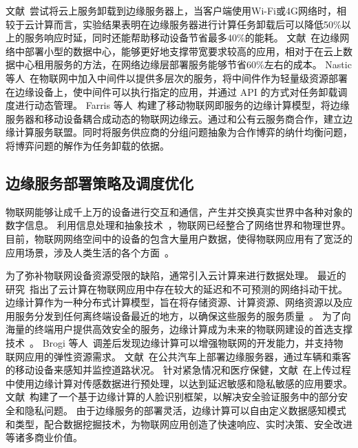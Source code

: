文献~\cite{gao2015cloudlets}尝试将云上服务卸载到边缘服务器上，当客户端使用Wi-Fi或4G网络时，相较于云计算而言，实验结果表明在边缘服务器进行计算任务卸载后可以降低50\%以上的服务响应时延，同时还能帮助移动设备节省最多40\%的能耗。
文献~\cite{DBLP:conf/saso/MehtaTKTKE16}在边缘网络中部署小型的数据中心，能够更好地支撑带宽要求较高的应用，相对于在云上数据中心租用服务的方法，在网络边缘层部署服务能够节省60\%左右的成本。
Nastic等人~\cite{DBLP:conf/edge/NasticTD16}在物联网中加入中间件以提供多层次的服务，将中间件作为轻量级资源部署在边缘设备上，使中间件可以执行指定的应用，并通过 API 的方式对任务卸载调度进行动态管理。
Farris 等人~\cite{DBLP:journals/fgcs/FarrisMNAI17}构建了移动物联网即服务的边缘计算模型，将边缘服务器和移动设备耦合成动态的物联网边缘云。通过和公有云服务商合作，建立边缘计算服务联盟。同时将服务供应商的分组问题抽象为合作博弈的纳什均衡问题，将博弈问题的解作为任务卸载的依据。

\subsection{边缘服务部署策略及调度优化}

物联网能够让成千上万的设备进行交互和通信，产生并交换真实世界中各种对象的数字信息。
利用信息处理和抽象技术~\cite{DBLP:journals/iotj/GanzPBC15}，物联网已经整合了网络世界和物理世界。
目前，物联网网络空间中的设备的包含大量用户数据，使得物联网应用有了宽泛的应用场景，涉及人类生活的各个方面~\cite{DBLP:journals/cm/WangYXJD17}。

为了弥补物联网设备资源受限的缺陷，通常引入云计算来进行数据处理。
最近的研究~\cite{DBLP:journals/iotj/RazzaqueMPC16}指出了云计算在物联网应用中存在较大的延迟和不可预测的网络抖动干扰。
边缘计算作为一种分布式计算模型，旨在将存储资源、计算资源、网络资源以及应用服务分发到任何离终端设备最近的地方，以确保这些服务的服务质量~\cite{AI201877}。
为了向海量的终端用户提供高效安全的服务，边缘计算成为未来的物联网建设的首选支撑技术~\cite{DBLP:journals/iotj/LinYZYZZ17}。
Brogi 等人~\cite{DBLP:Journals/IOTj/BroGif17}调差后发现边缘计算可以增强物联网的开发能力，并支持物联网应用的弹性资源需求。
文献~\cite{DBLP:Journals/IOTj/BasuDanlS17}在公共汽车上部署边缘服务器，通过车辆和乘客的移动设备来感知并监控道路状况。
针对紧急情况和医疗保健，文献~\cite{7466912}在上传过程中使用边缘计算对传感数据进行预处理，以达到延迟敏感和隐私敏感的应用要求。
文献~\cite{7835115}构建了一个基于边缘计算的人脸识别框架，以解决安全验证服务中的部分安全和隐私问题。
由于边缘服务的部署灵活，边缘计算可以自由定义数据感知模式和类型，配合数据挖掘技术，为物联网应用创造了快速响应、实时决策、安全改进等诸多商业价值。

